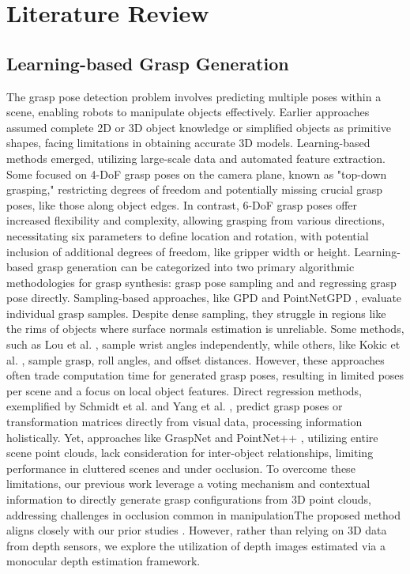 \section{Literature Review}
\label{sec:relatedwork}

\subsection{Learning-based Grasp Generation}

The grasp pose detection problem involves predicting multiple poses within a scene, enabling robots to manipulate objects effectively. Earlier approaches \cite{bicchi2000robotic, miller2003automatic} assumed complete 2D or 3D object knowledge or simplified objects as primitive shapes, facing limitations in obtaining accurate 3D models. Learning-based methods emerged, utilizing large-scale data and automated feature extraction. Some focused on 4-DoF grasp poses on the camera plane, known as "top-down grasping," restricting degrees of freedom and potentially missing crucial grasp poses, like those along object edges. In contrast, 6-DoF grasp poses offer increased flexibility and complexity, allowing grasping from various directions, necessitating six parameters to define location and rotation, with potential inclusion of additional degrees of freedom, like gripper width or height. Learning-based grasp generation can be categorized into two primary algorithmic methodologies for grasp synthesis: grasp pose sampling and and regressing grasp pose directly. Sampling-based approaches, like GPD \cite{ten2017grasp} and PointNetGPD \cite{liang2019pointnetgpd}, evaluate individual grasp samples. Despite dense sampling, they struggle in regions like the rims of objects where surface normals estimation is unreliable. Some methods, such as Lou et al. \cite{lou2020learning}, sample wrist angles independently, while others, like Kokic et al. \cite{kokic2020learning}, sample grasp, roll angles, and offset distances. However, these approaches often trade computation time for generated grasp poses, resulting in limited poses per scene and a focus on local object features. Direct regression methods, exemplified by Schmidt et al. \cite{schmidt2018grasping} and Yang et al. \cite{yang2021robotic}, predict grasp poses or transformation matrices directly from visual data, processing information holistically. Yet, approaches like GraspNet \cite{fang2020graspnet} and PointNet++ \cite{ni2020pointnet++}, utilizing entire scene point clouds, lack consideration for inter-object relationships, limiting performance in cluttered scenes and under occlusion. To overcome these limitations, our previous work \cite{hoang2023grasp, hoang2022context} leverage a voting mechanism and contextual information to directly generate grasp configurations from 3D point clouds, addressing challenges in occlusion common in manipulationThe proposed method aligns closely with our prior studies \cite{hoang2023grasp, hoang2022context}. However, rather than relying on 3D data from depth sensors, we explore the utilization of depth images estimated via a monocular depth estimation framework. 

